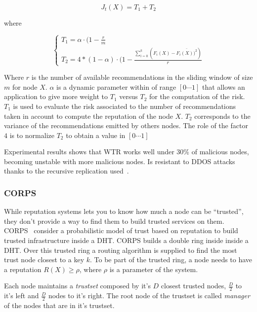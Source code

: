 \begin{equation}
  J_t(X) =  T_1 + T_2
\end{equation}

where

\begin{equation}
  \left\{
  \begin{array}{l}
    T_1 = \alpha \cdot (1-\frac{r}{m}\\
    T_2 = 4 * (1- \alpha) \cdot (1-\frac{\sum_{i=0}^{k} (F_i(X)-\bar{F_i(X))^2})}{r}
  \end{array}\right.
\end{equation}

Where $r$ is the number of available recommendations in the sliding window of
size $m$ for node $X$. $\alpha$ is a dynamic parameter within of range
$[0\cdots 1]$ that allows an application to give more weight to $T_1$ versus
$T_2$ for the computation of the risk. $T_1$ is used to evaluate the risk
associated to the number of recommendations taken in account to compute the
reputation of the node $X$. $T_2$ corresponds to the variance of the
recommendations emitted by others nodes. The role of the factor $4$ is to
normalize $T_2$ to obtain a value in $[0\cdots 1]$

Experimental results shows that WTR works well under $30\%$ of malicious nodes,
becoming unstable with more malicious nodes. Is resistant to DDOS attacks
thanks to the recursive replication used~\cite{recursive_replication}.

\subsubsection{CORPS}
\label{sec:corps}
While reputation systems lets you to know how much a node can be
``trusted'', they don't provide a way to find them to build trusted services on
them. CORPS~\cite{rosas2011corps} consider a probabilistic model of trust based on
reputation to build trusted infrastructure inside a DHT. CORPS builds a double
ring inside inside a DHT. Over this trusted ring a routing algorithm is supplied to
find the most trust node closest to a key $k$.
To be part of the trusted ring, a node needs to have a reputation $R(X) \ge
\rho$, where $\rho$ is a parameter of the system. 

Each node maintains a \textit{trustset} composed by it's $D$ closest trusted
nodes, $\frac{D}{2}$ to it's left and $\frac{D}{2}$ nodes to it's right.
The root node of the trustset is called \textit{manager} of the nodes that are
in it's trustset.

